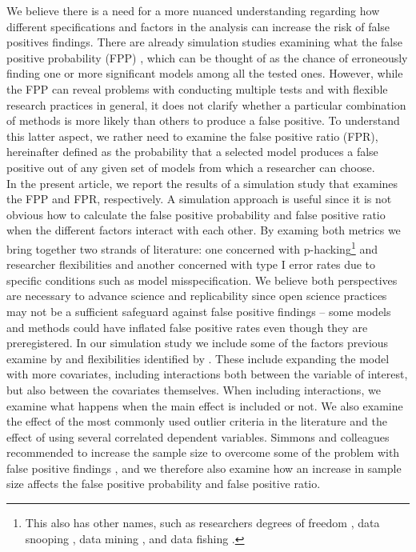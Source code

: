 
We believe there is a need for a more nuanced understanding regarding how different specifications and factors in the analysis can increase the risk of false positives findings. There are already simulation studies examining what the false positive probability (FPP) \citep{Simmons2011}, which can be thought of as the chance of erroneously finding one or more significant models among all the tested ones. However, while the FPP can reveal problems with conducting multiple tests and with flexible research practices in general, it does not clarify whether a particular combination of methods is more likely than others to produce a false positive. To understand this latter aspect, we rather need to examine the false positive ratio (FPR), hereinafter defined as the probability that a selected model produces a false positive out of any given set of models from which a researcher can choose. \\

In the present article, we report the results of a simulation study that examines the FPP and FPR, respectively. A simulation approach is useful since it is not obvious how to calculate the false positive probability and false positive ratio when the different factors interact with each other. By examing both metrics we bring together two strands of literature: one concerned with p-hacking\footnote{This also has other names, such as researchers degrees of freedom \citep{Simmons2011}, data snooping \citep{white2000reality}, data mining \citep{lovell1983}, and data fishing \citep{selvin1966data} .} \citep{simonsohn2014p} and researcher flexibilities and another concerned with type I error rates due to specific conditions such as model misspecification. We believe both perspectives are necessary to advance science and replicability since open science practices may not be a sufficient safeguard against false positive findings – some models and methods could have inflated false positive rates even though they are preregistered. In our simulation study we include some of the factors previous examine by \cite{Simmons2011} and flexibilities identified by \cite{Wicherts2016}. These include expanding the model with more covariates, including interactions both between the variable of interest, but also between the covariates themselves. When including interactions, we examine what happens when the main effect is included or not. We also examine the effect of the most commonly used outlier criteria in the literature \citep{Leyes2013} and the effect of using several correlated dependent variables. Simmons and colleagues recommended to increase the sample size to overcome some of the problem with false positive findings \citep{Simmons2011}, and we therefore also examine how an increase in sample size affects the false positive probability and false positive ratio. 

